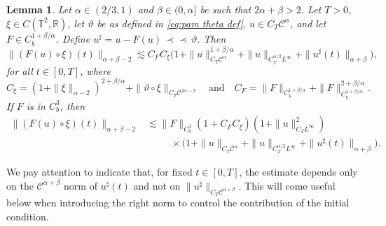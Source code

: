 \documentclass[a4paper,11pt]{article}
\newtheorem{lemma}[theorem]{Lemma}
\theoremstyle{remark}
\newcommand{\R}{\mathbb{R}}
\newcommand{\CC}{\ensuremath{\mathscr{C}}}
\newcommand{\reso}{\,\mathord{\circ}\,}
\newcommand{\mpara}{\,\mathord{\prec\!\!\!\prec}\,}
\begin{document}
\begin{lemma}\label{lem:pam circ apriori}
   Let $\alpha \in (2/3, 1)$ and $\beta \in (0,\alpha]$ be such that $2\alpha + \beta > 2$. Let $T>0$, $\xi \in C(\mathbb{T}^2, \R)$, let $\vartheta$ be as defined in \eqref{eq:pam theta def}, $u \in C_T \CC^\alpha$, and let $F \in C^{1+\beta/\alpha}_{b}$. Define $u^\sharp = u - F(u) \mpara \vartheta$. Then
  \begin{equation}\label{eq:pam circ apriori 1}
     \|(F(u) \reso \xi) (t) \|_{\alpha+\beta-2} \lesssim C_F C_\xi \big( 1 + \|u\|_{C_T\CC^\alpha}^{1+\beta/\alpha} + \|u\|_{C^{\alpha/2}_TL^\infty} + \|u^\sharp (t)\|_{\alpha+\beta} \big),
  \end{equation}
  for all $t \in [0,T]$, where
  \begin{equation}\label{eq:pam Cxi CF}
     C_{\xi} = (1+\| \xi \|_{\alpha -2})^{2+\beta/\alpha} + \| \vartheta \reso   \xi \|_{C_{T} \CC^{2 \alpha -2}} \quad \text{and} \quad C_{F} = \| F \|_{C^{1+\beta/\alpha}_{b}}+\| F \|_{C^{1+\beta/\alpha}_{b}}^{2+\beta/\alpha}.
  \end{equation}
  If $F$ is in $C^3_b$, then
  \begin{align}\label{eq:pam circ apriori 2} \nonumber
     \|(F(u) \reso \xi) (t) \|_{\alpha+\beta-2} & \lesssim \|F\|_{C^3_b} (1+C_F C_\xi) (1+ \|u\|_{C_T L^\infty}^2) \\
     &\hspace{30pt} \times \big( 1 + \|u\|_{C_T\CC^\alpha} + \|u\|_{C^{\alpha/2}_TL^\infty} + \|u^\sharp (t)\|_{\alpha+\beta} \big).
  \end{align}
\end{lemma}

We pay attention to indicate that, for fixed $t \in [ 0,T ]$, the
estimate depends only on the $\CC^{\alpha + \beta}$ norm of
$u^{\sharp} ( t )$ and not on $\|u^\sharp\|_{C_T\CC^{\alpha+\beta}}$. This will come useful below when introducing the right
norm to control the contribution of the initial condition.
\end{document}
